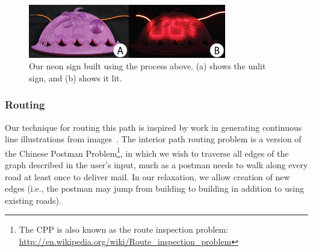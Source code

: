 \begin{figure}[h!]
\centering
    \includegraphics[width=3.4in]{figures/uistphotos.png}
\caption{Our neon sign built using the process above.  (a) shows the unlit sign, and (b) shows it lit.}
\label{fig:UIST}
\end{figure}

\subsubsection{Routing}
%

Our technique for routing this path is inspired by work in generating continuous line illustrations from images~\cite{Wong-continuousline,Bosch-tsp}.  The interior path routing problem is a version of the Chinese Postman Problem\footnote{The CPP is also known as the route inspection problem: \url{http://en.wikipedia.org/wiki/Route_inspection_problem}}, in which we wish to traverse all edges of the graph described in the user's input, much as a postman needs to walk along every road at least once to deliver mail.  In our relaxation, we allow creation of new edges (i.e., the postman may jump from building to building in addition to using existing roads).
%

